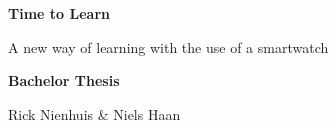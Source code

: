 {%


\newcommand{\thesistitle}{Time to Learn}
\newcommand{\thesisauthor}{Rick Nienhuis \& Niels Haan}

\newcommand{\thesisleiter}{Dr.\ Mircea Lungu}
\newcommand{\thesisasst}{Dr.\ Alexander Lazovik}
\newcommand{\thesissubtitle}{A new way of learning with the use of a smartwatch}
\newcommand{\thesisdate}{31. Augustus 2016}


\usepackage[ colorlinks=true, urlcolor=black, linkcolor=black,
			citecolor=black, bookmarksnumbered=true, bookmarks=true,
			plainpages=false,
			pdftitle={\thesistitle}, pdfauthor={\thesisauthor},
			pdfsubject={\thesissubtitle}, pdfpagelabels]{hyperref}

\newcommand{\hrref}[2]{\hyperref}




\begin{titlepage}  
  \begin{center}  
  
  \begin{figure}[t]  
  \vspace*{-2cm}        %
  \vspace{1.2in}     
  \end{figure}

    \thispagestyle{empty}
    
    {\bfseries\Huge \thesistitle \par 
    \Large \vspace{0.1in} \thesissubtitle \par}

    \vspace{0.3in} 
    \LARGE{\textbf{Bachelor Thesis} \\}
    \vspace{0.4in}

    {\Large \thesisauthor}
    

\end{center}
\end{titlepage}}
